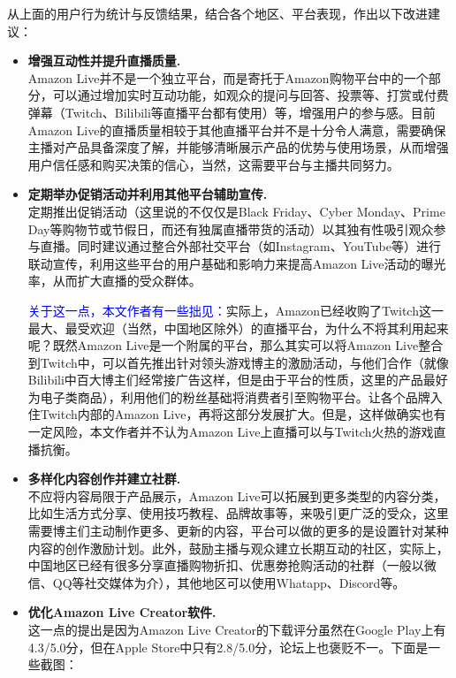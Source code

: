 \documentclass[12pt]{ctexart}
\begin{document}
从上面的用户行为统计与反馈结果，结合各个地区、平台表现，作出以下改进建议：
\begin{itemize}
    \item \textbf{增强互动性并提升直播质量.} \\
    Amazon Live并不是一个独立平台，而是寄托于Amazon购物平台中的一个部分，可以通过增加实时互动功能，如观众的提问与回答、投票等、打赏或付费弹幕（Twitch、Bilibili等直播平台都有使用）等，增强用户的参与感。目前Amazon Live的直播质量相较于其他直播平台并不是十分令人满意，需要确保主播对产品具备深度了解，并能够清晰展示产品的优势与使用场景，从而增强用户信任感和购买决策的信心，当然，这需要平台与主播共同努力。
    
    \item \textbf{定期举办促销活动并利用其他平台辅助宣传.}\\
    定期推出促销活动（这里说的不仅仅是Black Friday、Cyber Monday、Prime Day等购物节或节假日，而还有独属直播带货的活动）以其独有性吸引观众参与直播。同时建议通过整合外部社交平台（如Instagram、YouTube等）进行联动宣传，利用这些平台的用户基础和影响力来提高Amazon Live活动的曝光率，从而扩大直播的受众群体。
    
    \textcolor{blue}{关于这一点，本文作者有一些拙见：}实际上，Amazon已经收购了Twitch这一最大、最受欢迎（当然，中国地区除外）的直播平台，为什么不将其利用起来呢？既然Amazon Live是一个附属的平台，那么其实可以将Amazon Live整合到Twitch中，可以首先推出针对领头游戏博主的激励活动，与他们合作（就像Bilibili中百大博主们经常接广告这样，但是由于平台的性质，这里的产品最好为电子类商品），利用他们的粉丝基础将消费者引至购物平台。让各个品牌入住Twitch内部的Amazon Live，再将这部分发展扩大。但是，这样做确实也有一定风险，本文作者并不认为Amazon Live上直播可以与Twitch火热的游戏直播抗衡。
    
    \item \textbf{多样化内容创作并建立社群.} \\
    不应将内容局限于产品展示，Amazon Live可以拓展到更多类型的内容分类，比如生活方式分享、使用技巧教程、品牌故事等，来吸引更广泛的受众，这里需要博主们主动制作更多、更新的内容，平台可以做的更多的是设置针对某种内容的创作激励计划。此外，鼓励主播与观众建立长期互动的社区，实际上，中国地区已经有很多分享直播购物折扣、优惠劵抢购活动的社群（一般以微信、QQ等社交媒体为介），其他地区可以使用Whatapp、Discord等。
    
    \item \textbf{优化Amazon Live Creator软件.} \\
    这一点的提出是因为Amazon Live Creator的下载评分虽然在Google Play上有4.3/5.0分，但在Apple Store中只有2.8/5.0分，论坛上也褒贬不一。下面是一些截图：


\end{itemize}
\end{document}
